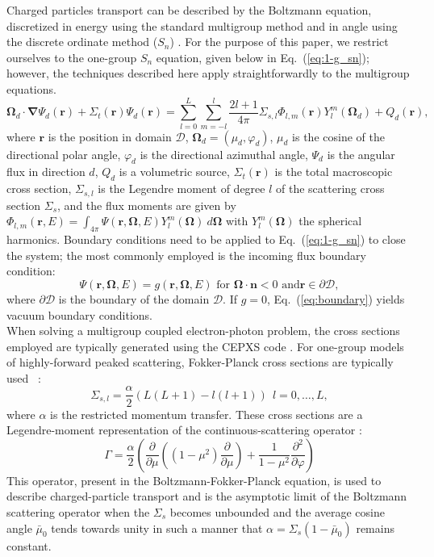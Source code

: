 \documentclass[preprint,10pt]{elsarticle}
\newcommand\bn{\boldsymbol{\nabla}}
\newcommand\bo{\boldsymbol{\Omega}}
\newcommand\br{\mathbf{r}}
\newcommand\bs{\boldsymbol}
\renewcommand{\(}{\left(}
\renewcommand{\)}{\right)}
\renewcommand{\[}{\left[}
\renewcommand{\]}{\right]}
\newcommand{\eqt}[1]{Eq.~(\ref{#1})}                     %
\begin{document}
Charged particles transport can be described by the Boltzmann equation, 
discretized in energy using the standard multigroup method
and in angle using the discrete ordinate method ($S_n$)
\cite{morel_81,galerkin_quad_morel89,cepxs}. For the purpose of this paper, 
we restrict ourselves to the one-group $S_n$ equation,
given below in \eqt{eq:1-g_sn}; however, the techniques described here
apply straightforwardly to the multigroup equations.
%
\begin{equation}
\bo_d \cdot \bn \Psi_d(\br) + \Sigma_{t}(\br) \Psi_d(\br) = 
\sum_{l=0}^L\sum_{m=-l}^l \frac{2l+1}{4\pi}\Sigma_{s,l}
\Phi_{l,m}(\br)Y_l^m(\bo_d) + Q_d(\br) ,
\label{eq:1-g_sn}
\end{equation}
%
where $\br$ is the position in domain $\mathcal{D}$, $\bo_d=(\mu_d,\varphi_d)$, 
$\mu_d$ is the cosine of the directional polar angle,
$\varphi_d$ is the directional azimuthal angle, $\Psi_d$ is
the angular flux in direction $d$, $Q_d$ is a volumetric source, $\Sigma_{t}(\br)$ is the total 
macroscopic cross section, $\Sigma_{s,l}$ is the Legendre moment of 
degree $l$ of the scattering cross section $\Sigma_s$, and the flux moments are given by 
$\Phi_{l,m}(\br,E)= \int_{4\pi}\Psi(\br,\bo,E)Y_l^{m}(\bo)\ d\bo$
with  $Y_l^m(\bo)$ the spherical harmonics.
%
Boundary conditions need to be applied to \eqt{eq:1-g_sn} to close the system; the most
commonly employed is the incoming flux boundary condition:
%
\begin{equation}
\Psi(\br,\bo,E) = g(\br,\bo,E)\textrm{ for }\bo\cdot\bs{n}<0\textrm{ and
}\br\in \partial \mathcal{D},
\label{eq:boundary}
\end{equation} 
%
where $\partial \mathcal{D}$ is the boundary of the domain $\mathcal{D}$. If $g=0$, \eqt{eq:boundary}
yields vacuum boundary conditions.\\
When solving a multigroup coupled electron-photon problem, the cross sections employed are typically generated using
the CEPXS code \cite{cepxs}. For one-group models of highly-forward peaked scattering, Fokker-Planck cross sections 
are typically used \hbox{\cite{multigrid_1d,multigrid_2d,morel_81,morel_96} :}
%
\begin{equation}
\Sigma_{s,l}=\frac{\alpha}{2} (L(L+1)-l(l+1))\ \ l=0,\hdots,L ,
\end{equation}
%
where $\alpha$ is the restricted momentum transfer.
These cross sections are a Legendre-moment representation of the
continuous-scattering operator \cite{morel_96} :
%
\begin{equation}
\Gamma = \frac{\alpha}{2} \(\frac{\partial }{\partial \mu}\((1-\mu^2)\frac{\partial
}{\partial \mu}\)+\frac{1}{1-\mu^2}\frac{\partial^2}{\partial \varphi}\)
\end{equation}
%
This operator, present in the Boltzmann-Fokker-Planck equation, is used to describe
charged-particle transport \cite{morel_81,morel_96} and is the asymptotic 
limit of the  Boltzmann scattering operator when the $\Sigma_s$ becomes 
unbounded and the average cosine angle $\bar{\mu}_0$ tends towards unity in 
such a manner that $\alpha = \Sigma_s(1-\bar{\mu}_0)$ remains constant.\\
\end{document}
